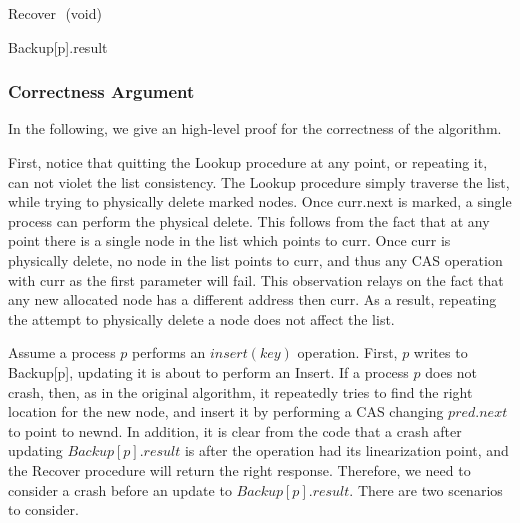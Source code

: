 \begin{procedure}[H]
	\footnotesize
	
	\caption{Recover $ $ (void)}
	
	 {\KwRet Backup[p].result}
	
\end{procedure}


\clearpage
\subsubsection*{Correctness Argument}
In the following, we give an high-level proof for the correctness of the algorithm.

First, notice that quitting the Lookup procedure at any point, or repeating it, can not violet the list consistency. The Lookup procedure simply traverse the list, while trying to physically delete marked nodes.
Once curr.next is marked, a single process can perform the physical delete. This follows from the fact that at any point there is a single node in the list which points to curr. Once curr is physically delete, no node in the list points to curr, and thus any CAS operation with curr as the first parameter will fail. This observation relays on the fact that any new allocated node has a different address then curr. As a result, repeating the attempt to physically delete a node does not affect the list.

Assume a process $p$ performs an $insert(key)$ operation. First, $p$ writes to Backup[p], updating it is about to perform an Insert. If a process $p$ does not crash, then, as in the original algorithm, it repeatedly tries to find the right location for the new node, and insert it by performing a CAS changing $pred.next$ to point to newnd. In addition, it is clear from the code that a crash after updating $Backup[p].result$ is after the operation had its linearization point, and the Recover procedure will return the right response. Therefore, we need to consider a crash before an update to $Backup[p].result$. There are two scenarios to consider.

